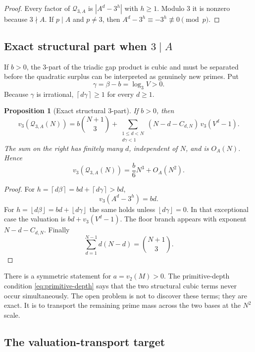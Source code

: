 \documentclass[11pt,oneside]{article}
\newtheorem{proposition}[theorem]{Proposition}
\theoremstyle{definition}
\theoremstyle{remark}
\newcommand{\floor}[1]{\left\lfloor #1\right\rfloor}
\newcommand{\ceil}[1]{\left\lceil #1\right\rceil}
\newcommand{\vpp}[2]{v_{#1}\!\left(#2\right)}
\begin{document}
\begin{proof}
Every factor of $\mathcal Q_{3,A}$ is $|A^d-3^h|$ with $h\ge1$.  Modulo $3$ it is nonzero
because $3\nmid A$.  If $p\mid A$ and $p\ne3$, then $A^d-3^h\equiv-3^h\not\equiv0\pmod p$.
\end{proof}

\subsection{Exact structural part when \texorpdfstring{$3\mid A$}{3 divides A}}

If $b>0$, the $3$-part of the triadic gap product is cubic and must be separated before the
quadratic surplus can be interpreted as genuinely new primes.  Put
\[
 \gamma=\beta-b=\log_3V>0.
\]
Because $\gamma$ is irrational, $\ceil{d\gamma}\ge1$ for every $d\ge1$.

\begin{proposition}[Exact structural $3$-part]
\label{prop:structural-three}
If $b>0$, then
\begin{equation}
 \vpp{3}{\mathcal Q_{3,A}(N)}
 =b\binom{N+1}{3}
 +\sum_{\substack{1\le d<N\\d\gamma<1}}
 (N-d-C_{d,N})\,\vpp{3}{V^d-1}.
 \label{eq:structural-three}
\end{equation}
The sum on the right has finitely many $d$, independent of $N$, and is $O_A(N)$.  Hence
\begin{equation}
 \vpp{3}{\mathcal Q_{3,A}(N)}
 =\frac{b}{6}N^3+O_A(N^2).
 \label{eq:structural-three-asymp}
\end{equation}
\end{proposition}

\begin{proof}
For $h=\ceil{d\beta}=bd+\ceil{d\gamma}>bd$,
\[
 \vpp{3}{A^d-3^h}=bd.
\]
For $h=\floor{d\beta}=bd+\floor{d\gamma}$ the same holds unless
$\floor{d\gamma}=0$.  In that exceptional case the valuation is
$bd+\vpp{3}{V^d-1}$.  The floor branch appears with exponent
$N-d-C_{d,N}$.  Finally
\[
 \sum_{d=1}^{N-1}d(N-d)=\binom{N+1}{3}.
\]
\end{proof}

There is a symmetric statement for $a=\vpp{2}{M}>0$.  The primitive-depth condition
\eqref{eq:primitive-depth} says that the two structural cubic terms never occur simultaneously.
The open problem is not to discover these terms; they are exact.  It is to transport the
remaining prime mass across the two bases at the $N^2$ scale.

\subsection{The valuation-transport target}
\end{document}

